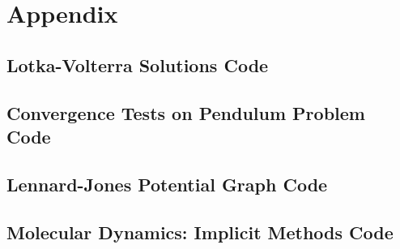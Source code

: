 \documentclass[../Main.tex]{subfiles}
\begin{document}
\section{Appendix}

\subsection{ Lotka-Volterra Solutions Code}


\newpage
\subsection{Convergence Tests on Pendulum Problem Code}



\newpage
\subsection{Lennard-Jones Potential Graph Code}


\newpage
\subsection{Molecular Dynamics: Implicit Methods Code}






\BlankLine
\BlankLine

\end{document}
